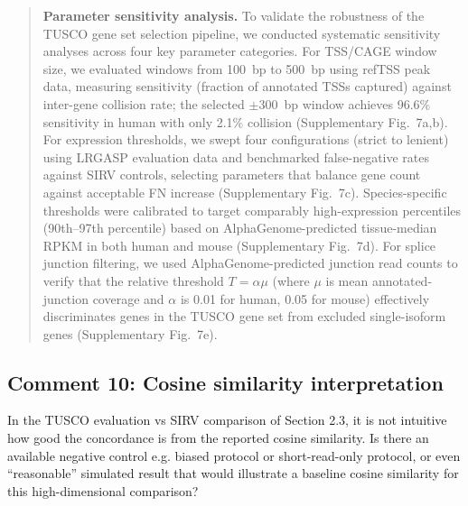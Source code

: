 \documentclass[11pt]{article}
\newcommand{\tuscoGeneSet}{TUSCO gene set}
\begin{document}
\begin{responseboxnew}
\begin{quote}
\textbf{Parameter sensitivity analysis.} To validate the robustness of the \tuscoGeneSet{} selection pipeline, we conducted systematic sensitivity analyses across four key parameter categories. For TSS/CAGE window size, we evaluated windows from 100~bp to 500~bp using refTSS peak data, measuring sensitivity (fraction of annotated TSSs captured) against inter-gene collision rate; the selected $\pm 300$~bp window achieves 96.6\% sensitivity in human with only 2.1\% collision (Supplementary Fig.~7a,b). For expression thresholds, we swept four configurations (strict to lenient) using LRGASP evaluation data and benchmarked false-negative rates against SIRV controls, selecting parameters that balance gene count against acceptable FN increase (Supplementary Fig.~7c). Species-specific thresholds were calibrated to target comparably high-expression percentiles (90th--97th percentile) based on AlphaGenome-predicted tissue-median RPKM in both human and mouse (Supplementary Fig.~7d). For splice junction filtering, we used AlphaGenome-predicted junction read counts to verify that the relative threshold $T = \alpha\mu$ (where $\mu$ is mean annotated-junction coverage and $\alpha$ is 0.01 for human, 0.05 for mouse) effectively discriminates genes in the \tuscoGeneSet{} from excluded single-isoform genes (Supplementary Fig.~7e).
\end{quote}
\end{responseboxnew}

\subsection{Comment 10: Cosine similarity interpretation}

\begin{reviewercomment}
In the TUSCO evaluation vs SIRV comparison of Section 2.3, it is not intuitive how good the concordance is from the reported cosine similarity. Is there an available negative control e.g. biased protocol or short-read-only protocol, or even ``reasonable'' simulated result that would illustrate a baseline cosine similarity for this high-dimensional comparison?
\end{reviewercomment}
\end{document}

